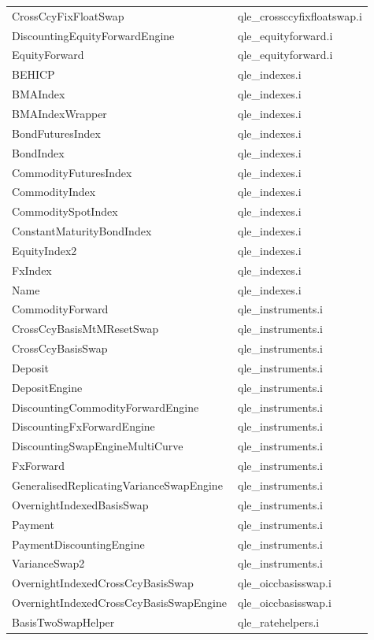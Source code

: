 \documentclass[12pt, a4paper]{report}
\begin{document}
\begin{appendix}
{\begin{longtable}{|l|l|}
CrossCcyFixFloatSwap & qle\_crossccyfixfloatswap.i \\
DiscountingEquityForwardEngine & qle\_equityforward.i \\
EquityForward & qle\_equityforward.i \\
BEHICP & qle\_indexes.i \\
BMAIndex & qle\_indexes.i \\
BMAIndexWrapper & qle\_indexes.i \\
BondFuturesIndex & qle\_indexes.i \\
BondIndex & qle\_indexes.i \\
CommodityFuturesIndex & qle\_indexes.i \\
CommodityIndex & qle\_indexes.i \\
CommoditySpotIndex & qle\_indexes.i \\
ConstantMaturityBondIndex & qle\_indexes.i \\
EquityIndex2 & qle\_indexes.i \\
FxIndex & qle\_indexes.i \\
Name & qle\_indexes.i \\
CommodityForward & qle\_instruments.i \\
CrossCcyBasisMtMResetSwap & qle\_instruments.i \\
CrossCcyBasisSwap & qle\_instruments.i \\
Deposit & qle\_instruments.i \\
DepositEngine & qle\_instruments.i \\
DiscountingCommodityForwardEngine & qle\_instruments.i \\
DiscountingFxForwardEngine & qle\_instruments.i \\
DiscountingSwapEngineMultiCurve & qle\_instruments.i \\
FxForward & qle\_instruments.i \\
GeneralisedReplicatingVarianceSwapEngine & qle\_instruments.i \\
OvernightIndexedBasisSwap & qle\_instruments.i \\
Payment & qle\_instruments.i \\
PaymentDiscountingEngine & qle\_instruments.i \\
VarianceSwap2 & qle\_instruments.i \\
OvernightIndexedCrossCcyBasisSwap & qle\_oiccbasisswap.i \\
OvernightIndexedCrossCcyBasisSwapEngine & qle\_oiccbasisswap.i \\
BasisTwoSwapHelper & qle\_ratehelpers.i \\

\end{longtable}}
\end{appendix}
\end{document}
